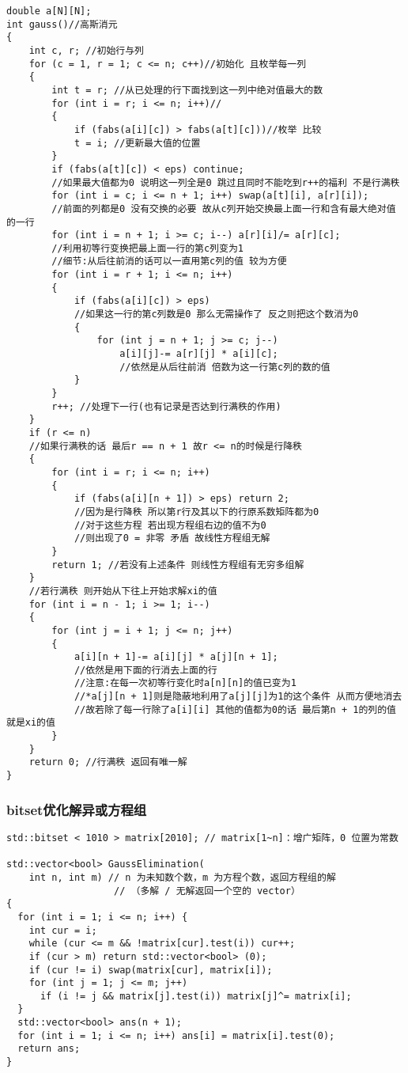 \documentclass[a4paper,fontset=none]{ctexart}
\begin{document}
\begin{verbatim}
double a[N][N];
int gauss()//高斯消元
{
    int c, r; //初始行与列
    for (c = 1, r = 1; c <= n; c++)//初始化 且枚举每一列
    {
        int t = r; //从已处理的行下面找到这一列中绝对值最大的数
        for (int i = r; i <= n; i++)//
        {
            if (fabs(a[i][c]) > fabs(a[t][c]))//枚举 比较
            t = i; //更新最大值的位置
        }
        if (fabs(a[t][c]) < eps) continue;
        //如果最大值都为0 说明这一列全是0 跳过且同时不能吃到r++的福利 不是行满秩
        for (int i = c; i <= n + 1; i++) swap(a[t][i], a[r][i]);
        //前面的列都是0 没有交换的必要 故从c列开始交换最上面一行和含有最大绝对值的一行
        for (int i = n + 1; i >= c; i--) a[r][i]/= a[r][c];
        //利用初等行变换把最上面一行的第c列变为1
        //细节:从后往前消的话可以一直用第c列的值 较为方便
        for (int i = r + 1; i <= n; i++)
        {
            if (fabs(a[i][c]) > eps)
            //如果这一行的第c列数是0 那么无需操作了 反之则把这个数消为0
            {
                for (int j = n + 1; j >= c; j--)
                    a[i][j]-= a[r][j] * a[i][c];
                    //依然是从后往前消 倍数为这一行第c列的数的值
            }
        }
        r++; //处理下一行(也有记录是否达到行满秩的作用)
    }
    if (r <= n)
    //如果行满秩的话 最后r == n + 1 故r <= n的时候是行降秩
    {
        for (int i = r; i <= n; i++)
        {
            if (fabs(a[i][n + 1]) > eps) return 2;
            //因为是行降秩 所以第r行及其以下的行原系数矩阵都为0
            //对于这些方程 若出现方程组右边的值不为0
            //则出现了0 = 非零 矛盾 故线性方程组无解
        }
        return 1; //若没有上述条件 则线性方程组有无穷多组解
    }
    //若行满秩 则开始从下往上开始求解xi的值
    for (int i = n - 1; i >= 1; i--)
    {
        for (int j = i + 1; j <= n; j++)
        {
            a[i][n + 1]-= a[i][j] * a[j][n + 1];
            //依然是用下面的行消去上面的行
            //注意:在每一次初等行变化时a[n][n]的值已变为1
            //*a[j][n + 1]则是隐蔽地利用了a[j][j]为1的这个条件 从而方便地消去
            //故若除了每一行除了a[i][i] 其他的值都为0的话 最后第n + 1的列的值就是xi的值
        }
    }
    return 0; //行满秩 返回有唯一解
}
\end{verbatim}
\subsubsection{bitset优化解异或方程组}

\begin{verbatim}
std::bitset < 1010 > matrix[2010]; // matrix[1~n]：增广矩阵，0 位置为常数

std::vector<bool> GaussElimination(
    int n, int m) // n 为未知数个数，m 为方程个数，返回方程组的解
                   // （多解 / 无解返回一个空的 vector）
{
  for (int i = 1; i <= n; i++) {
    int cur = i;
    while (cur <= m && !matrix[cur].test(i)) cur++;
    if (cur > m) return std::vector<bool> (0);
    if (cur != i) swap(matrix[cur], matrix[i]);
    for (int j = 1; j <= m; j++)
      if (i != j && matrix[j].test(i)) matrix[j]^= matrix[i];
  }
  std::vector<bool> ans(n + 1);
  for (int i = 1; i <= n; i++) ans[i] = matrix[i].test(0);
  return ans;
}
\end{verbatim}
\end{document}
